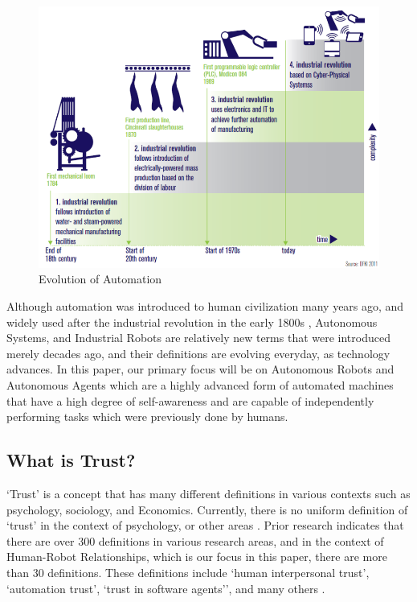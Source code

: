 \documentclass[runningheads,a4paper]{llncs}
\begin{document}
\begin{figure} [h!]
    \centering
        \includegraphics[width=\textwidth]{Figures/EvolutionOfAutomation.png}
    \caption{Evolution of Automation \cite{CyberSecurityInIndustry}}
    \label{Trust_Function}
\end{figure}
Although automation was introduced to human civilization many years ago, and widely used after the industrial revolution in the early 1800s \cite{IndustrialRevolution}, Autonomous Systems, and Industrial Robots are relatively new terms that were introduced merely decades ago, and their definitions are evolving everyday, as technology advances. In this paper, our primary focus will be on Autonomous Robots and Autonomous Agents which are a highly advanced form of automated machines that have a high degree of self-awareness and are capable of independently performing tasks which were previously done by humans.

\subsection{What is Trust?}
`Trust' is a concept that has many different definitions in various contexts such as psychology, sociology, and Economics. Currently, there is no uniform definition of `trust' in the context of psychology, or other areas \cite{adams2003trust}. Prior research indicates that there are over 300 definitions in various research areas, and in the context of Human-Robot Relationships, which is our focus in this paper, there are more than 30 definitions. These definitions include `human interpersonal trust', `automation trust', `trust in software agents'', and many others \cite{schaefer2013perception}. 
\end{document}
